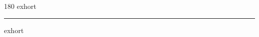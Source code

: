 
\begin{frame}
\begin{center}
\begin{turn}{180}
{\fontsize{2.5cm}{1em}\selectfont exhort}
\end{turn}
\vspace{1em}\par  
\hrule
\vspace{1em}\par  
{\fontsize{2.5cm}{1em}\selectfont exhort}
\end{center}
\end{frame}
